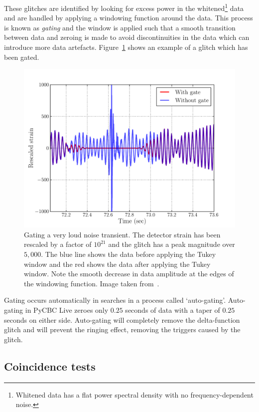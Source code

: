 These glitches are identified by looking for excess power in the whitened\footnote{Whitened data has a flat power spectral density with no frequency-dependent noise.} data and are handled by applying a windowing function around the data. This process is known as \textit{gating} and the window is applied such that a smooth transition between data and zeroing is made to avoid discontinuities in the data which can introduce more data artefacts. Figure~\ref{2:fig:autogating} shows an example of a glitch which has been gated.
%
\begin{figure}
    \centering
    \includegraphics[width=0.9\linewidth]{images/2_searches/autogating.pdf}
    \caption{Gating a very loud noise transient. The detector strain has been rescaled by a factor of $10^{21}$ and the glitch has a peak magnitude over $5,000$. The blue line shows the data before applying the Tukey window and the red shows the data after applying the Tukey window. Note the smooth decrease in data amplitude at the edges of the windowing function. Image taken from~\cite{PyCBC:2016}.}
    \label{2:fig:autogating}
\end{figure}
%

Gating occurs automatically in \gwadj searches in a process called `auto-gating'. Auto-gating in PyCBC Live zeroes only $0.25$ seconds of data with a taper of $0.25$ seconds on either side. Auto-gating will completely remove the delta-function glitch and will prevent the ringing effect, removing the triggers caused by the glitch.

\subsection{\label{2:sec:coincidence-test}Coincidence tests}

